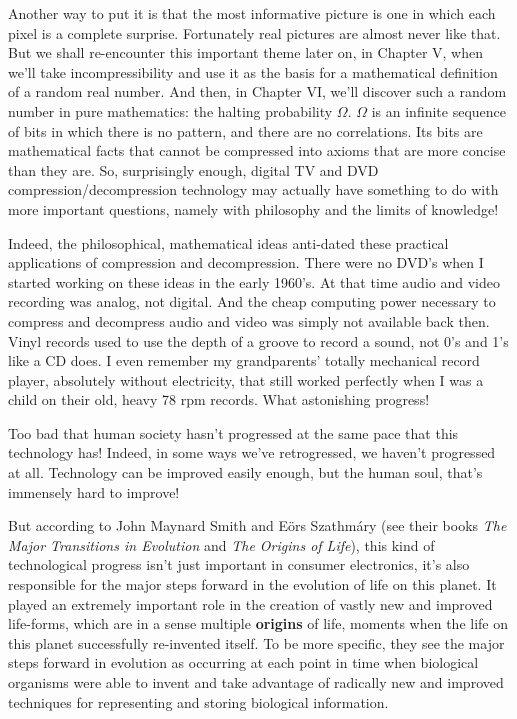 \documentclass[12pt]{book}
\begin{document}
Another way to put it is that the most informative picture is one in which each pixel
is a complete surprise. Fortunately real pictures are almost never like that.  But we shall
re-encounter this important theme later on, in Chapter V, when we'll take incompressibility and 
use it as the basis for
a mathematical definition of a random real number.  
And then, in Chapter VI, we'll discover such a random number in pure 
mathematics: the halting probability $\Omega$. 
$\Omega$ is an infinite sequence of bits in which there is no pattern, and there are no correlations. 
Its bits are
mathematical facts that cannot be compressed into axioms that are
more concise than they are.
So, surprisingly enough, digital TV and DVD compression/decompression technology 
may actually have something to do with
more important questions, namely with philosophy and the limits of knowledge!
 
Indeed, the philosophical, mathematical ideas anti-dated these practical applications 
of compression and decompression.
There were no DVD's when I started working on these ideas in the early 1960's.
At that time audio and video recording was analog, not digital. And the cheap computing
power necessary to compress and decompress audio and video was simply not available back then.
Vinyl records used to use the depth of a groove to record a sound, not 0's and 1's like a CD does.
I even remember my grandparents' totally mechanical record player, absolutely without
electricity, that still worked perfectly when I was a child on their old, heavy 78 rpm records.
What astonishing progress!
 
Too bad that human society hasn't progressed at the same pace that this technology has!
Indeed, in some ways we've retrogressed, we haven't progressed at all.
Technology can be improved easily enough, but the human soul, that's immensely hard to improve!
 
But according to John Maynard Smith and E\"ors Szathm\'ary
(see their books \emph{The Major Transitions in Evolution} and \emph{The Origins of Life}), 
this kind of technological progress isn't just
important in consumer electronics, it's also responsible for the major steps forward in the
evolution of life on this planet. It played an extremely important role in the creation of 
vastly new and improved life-forms, which are in a sense multiple \textbf{origins} of life, moments
when the life on this planet successfully re-invented itself. 
To be more specific, they see the major steps forward in evolution
as occurring
at each point in time when biological organisms were able to invent and take advantage of radically 
new and improved techniques for representing and storing biological information.
 
\end{document}
